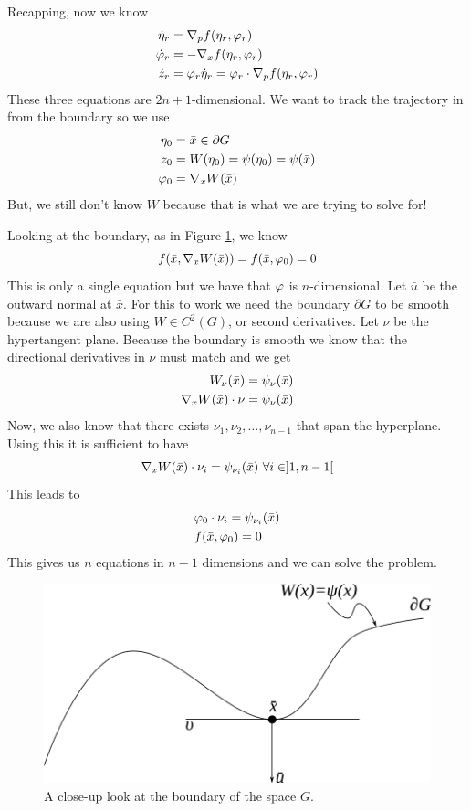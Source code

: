 Recapping, now we know
\begin{align*}
\dot{\eta}_r &= \nabla_pf(\eta_r,\varphi_r) \\
\dot{\varphi}_r &= -\nabla_xf(\eta_r,\varphi_r) \\
\dot{z}_r &= \varphi_r\dot{\eta}_r = \varphi_r\cdot \nabla_pf(\eta_r,\varphi_r)
\end{align*}
These three equations are $2n+1$-dimensional. We want to track the trajectory in from the boundary so we use
\begin{align*}
\eta_0 &= \bar{x} \in \partial G \\
z_0 &= W(\eta_0) = \psi(\eta_0) = \psi(\bar{x}) \\
\varphi_0 &= \nabla_xW(\bar{x})
\end{align*}
But, we still don't know $W$ because that is what we are trying to solve for!

Looking at the boundary, as in Figure \ref{fig:15gboundary}, we know
$$f(\bar{x},\nabla_xW(\bar{x})) = f(\bar{x},\varphi_0) = 0$$
This is only a single equation but we have that $\varphi$ is $n$-dimensional. Let $\bar{u}$ be the outward normal at $\bar{x}$. For this to work we need the boundary $\partial G$ to be smooth because we are also using $W\in C^2(G)$, or second derivatives. Let $\nu$ be the hypertangent plane. Because the boundary is smooth we know that the directional derivatives in $\nu$ must match and we get
\begin{align*}
W_\nu(\bar{x}) &= \psi_\nu(\bar{x}) \\
\nabla_xW(\bar{x})\cdot \nu &= \psi_\nu(\bar{x})
\end{align*}
Now, we also know that there exists $\nu_1,\nu_2,\ldots,\nu_{n-1}$ that span the hyperplane. Using this it is sufficient to have
$$\nabla_xW(\bar{x})\cdot\nu_i = \psi_{\nu_i}(\bar{x}) ~\forall i\in]1,n-1[$$
This leads to
\begin{align*}
&\varphi_0\cdot\nu_i = \psi_{\nu_i}(\bar{x}) \\
&f(\bar{x},\varphi_0) = 0
\end{align*}
This gives us $n$ equations in $n-1$ dimensions and we can solve the problem.

\begin{figure}[ht!]
	\centering
	\includegraphics[width=.2\textwidth]{images/15gboundary}
	\caption{A close-up look at the boundary of the space $G$.}
	\label{fig:15gboundary}
\end{figure}

